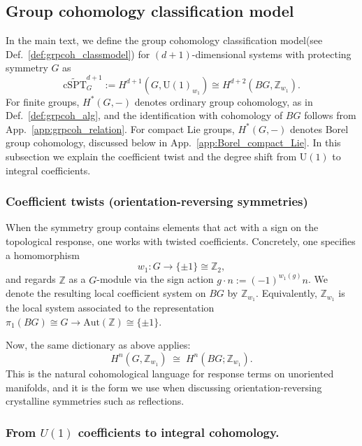 \documentclass[aps,prx,reprint,superscriptaddress,twocolumn,amsmath,amssymb,amsfonts, nofootinbib]{revtex4-2}
\newcommand{\U}{\text{U}}
\newcommand{\tcspt}{\widetilde{\text{cSPT}}^{d+1}_{G}}
\newcommand{\Z}{\mathbb{Z}}
\theoremstyle{apsstyle}
\begin{document}
\subsection{Group cohomology classification model}
\label{sec:grpcohmodel_def}

In the main text, we define the group cohomology classification model(see Def.~\ref{def:grpcoh_classmodel}) for $(d+1)$-dimensional systems with protecting symmetry $G$ as
\begin{equation}
    \tcspt := H^{d+1}(G, \U(1)_{w_{1}}) \cong H^{d+2}(BG, \Z_{w_{1}}).
    \label{eq:coh_iden}
\end{equation}
For finite groups, $H^{*}(G,-)$ denotes ordinary group cohomology, as in Def.~\ref{def:grpcoh_alg}, and the identification with cohomology of $BG$ follows from App.~\ref{app:grpcoh_relation}. For compact Lie groups, $H^{*}(G,-)$ denotes Borel group cohomology, discussed below in App.~\ref{app:Borel_compact_Lie}. In this subsection we explain the coefficient twist and the degree shift from $\U(1)$ to integral coefficients.

\subsubsection{Coefficient twists (orientation-reversing symmetries)}
When the symmetry group contains elements that act with a sign on the topological response, one works with twisted coefficients. Concretely, one specifies a homomorphism
\begin{equation}
    w_1:G\to \{\pm 1\}\cong \mathbb{Z}_2,
\end{equation}
and regards $\mathbb{Z}$ as a $G$-module via the sign action
$g\cdot n := (-1)^{w_1(g)}n$. We denote the resulting local coefficient system on $BG$ by
$\mathbb{Z}_{w_1}$. Equivalently, $\mathbb{Z}_{w_1}$ is the local system associated to the
representation $\pi_1(BG)\cong G \to \mathrm{Aut}(\mathbb{Z})\cong \{\pm 1\}$.

\bigskip 

\noindent Now, the same dictionary as above applies:
\begin{equation}
    H^{n}(G,\mathbb{Z}_{w_1}) \;\cong\; H^{n}(BG;\mathbb{Z}_{w_1}).
\end{equation}
This is the natural cohomological language for response terms on unoriented manifolds, and it is the form we use when discussing orientation-reversing crystalline symmetries such as reflections.

\subsubsection{From $U(1)$ coefficients to integral cohomology.}
\label{app:U1_coeff_to_Z}
\end{document}
